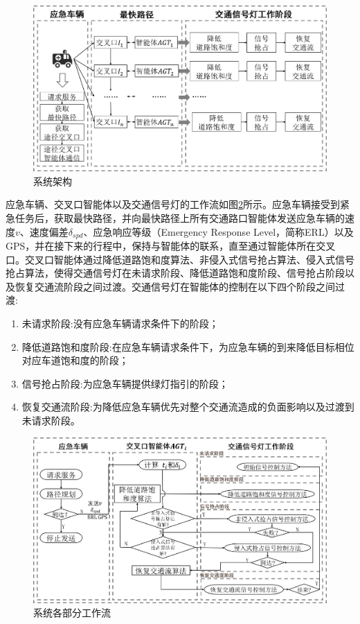\begin{figure}[ht]
	\centering
	\includegraphics[width=\textwidth]{figures/architecture.png}
	\caption{系统架构}
	\label{fig:architecture}
\end{figure}

应急车辆、交叉口智能体以及交通信号灯的工作流如图\ref{fig:kuangjia}所示。应急车辆接受到紧急任务后，获取最快路径，并向最快路径上所有交通路口智能体发送应急车辆的速度${v}$、速度偏差${\delta_{spd}}$、应急响应等级（Emergency Response Level，简称ERL）以及GPS，并在接下来的行程中，保持与智能体的联系，直至通过智能体所在交叉口。交叉口智能体通过降低道路饱和度算法、非侵入式信号抢占算法、侵入式信号抢占算法，使得交通信号灯在未请求阶段、降低道路饱和度阶段、信号抢占阶段以及恢复交通流阶段之间过渡。交通信号灯在智能体的控制在以下四个阶段之间过渡:

\begin{enumerate}
	\item 未请求阶段:没有应急车辆请求条件下的阶段；
	\item 降低道路饱和度阶段:在应急车辆请求条件下，为应急车辆的到来降低目标相位对应车道饱和度的阶段；
	\item 信号抢占阶段:为应急车辆提供绿灯指引的阶段；
	\item 恢复交通流阶段:为降低应急车辆优先对整个交通流造成的负面影响以及过渡到未请求阶段。
\end{enumerate}

\begin{figure}[ht]
	\centering
	\includegraphics[width=\textwidth]{figures/kuangjia.png}
	\caption{系统各部分工作流}
	\label{fig:kuangjia}
\end{figure}



